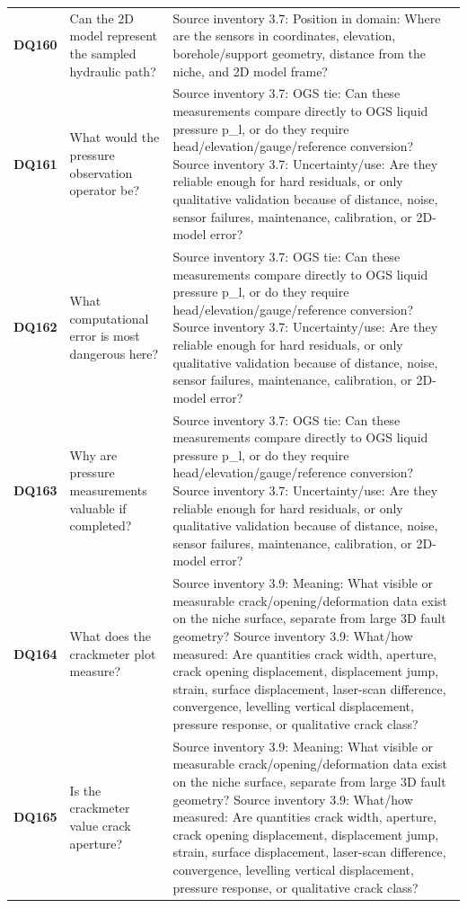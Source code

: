\begin{longtable}{@{}L{0.09\textwidth} L{0.31\textwidth} L{0.52\textwidth}@{}}
\addlinespace[0.18em]
\textbf{DQ160} & Can the 2D model represent the sampled hydraulic path? & Source inventory 3.7: Position in domain: Where are the sensors in coordinates, elevation, borehole/support geometry, distance from the niche, and 2D model frame?\\
\addlinespace[0.18em]
\textbf{DQ161} & What would the pressure observation operator be? & Source inventory 3.7: OGS tie: Can these measurements compare directly to OGS liquid pressure p\_l, or do they require head/elevation/gauge/reference conversion? Source inventory 3.7: Uncertainty/use: Are they reliable enough for hard residuals, or only qualitative validation because of distance, noise, sensor failures, maintenance, calibration, or 2D-model error?\\
\addlinespace[0.18em]
\textbf{DQ162} & What computational error is most dangerous here? & Source inventory 3.7: OGS tie: Can these measurements compare directly to OGS liquid pressure p\_l, or do they require head/elevation/gauge/reference conversion? Source inventory 3.7: Uncertainty/use: Are they reliable enough for hard residuals, or only qualitative validation because of distance, noise, sensor failures, maintenance, calibration, or 2D-model error?\\
\addlinespace[0.18em]
\textbf{DQ163} & Why are pressure measurements valuable if completed? & Source inventory 3.7: OGS tie: Can these measurements compare directly to OGS liquid pressure p\_l, or do they require head/elevation/gauge/reference conversion? Source inventory 3.7: Uncertainty/use: Are they reliable enough for hard residuals, or only qualitative validation because of distance, noise, sensor failures, maintenance, calibration, or 2D-model error?\\
\addlinespace[0.18em]
\textbf{DQ164} & What does the crackmeter plot measure? & Source inventory 3.9: Meaning: What visible or measurable crack/opening/deformation data exist on the niche surface, separate from large 3D fault geometry? Source inventory 3.9: What/how measured: Are quantities crack width, aperture, crack opening displacement, displacement jump, strain, surface displacement, laser-scan difference, convergence, levelling vertical displacement, pressure response, or qualitative crack class?\\
\addlinespace[0.18em]
\textbf{DQ165} & Is the crackmeter value crack aperture? & Source inventory 3.9: Meaning: What visible or measurable crack/opening/deformation data exist on the niche surface, separate from large 3D fault geometry? Source inventory 3.9: What/how measured: Are quantities crack width, aperture, crack opening displacement, displacement jump, strain, surface displacement, laser-scan difference, convergence, levelling vertical displacement, pressure response, or qualitative crack class?\\

\end{longtable}
